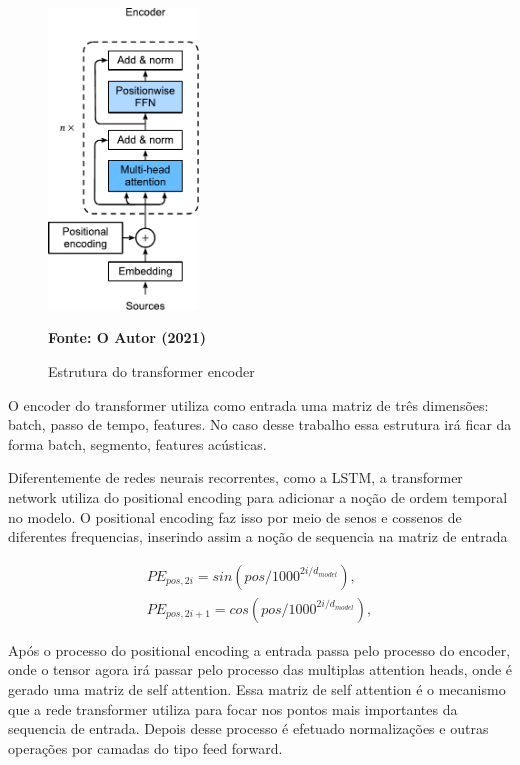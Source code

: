 \documentclass[
	12pt,				%
	openright,			%
	oneside,			%
	a4paper,			%
	chapter=TITLE,		%
	english,			%
	french,				%
	spanish,			%
	brazil				%
	]{abntex2}
\theoremstyle{definition}
\begin{document}
\begin{figure}[!htb]
	\caption{Estrutura do transformer encoder}
	\label{fig:estrutura_dna}
	\centering
	\includegraphics[width=4cm]{transformer_encoder.pdf} \\
	\begin{small}\textbf{Fonte: O Autor (2021)}\end{small}
\end{figure}

O encoder do transformer utiliza como entrada uma matriz de três dimensões: batch, passo de tempo, features. No caso desse trabalho essa estrutura irá ficar da forma batch, segmento, features acústicas.

Diferentemente de redes neurais recorrentes, como a LSTM, a transformer network utiliza do positional encoding para adicionar a noção de ordem temporal no modelo. O positional encoding faz isso por meio de senos e cossenos de diferentes frequencias, inserindo assim a noção de sequencia na matriz de entrada

\begin{align}
	PE_{pos, 2i} = sin(pos/1000^{2i/d_{model}}), \\
	PE_{pos, 2i+1} = cos(pos/1000^{2i/d_{model}}),
	\label{eq:pe}
\end{align}

Após o processo do positional encoding a entrada passa pelo processo do encoder, onde o tensor agora irá passar pelo processo das multiplas attention heads, onde é gerado uma matriz de self attention. Essa matriz de self attention é o mecanismo que a rede transformer utiliza para focar nos pontos mais importantes da sequencia de entrada. Depois desse processo é efetuado normalizações e outras operações por camadas do tipo feed forward.
\end{document}
